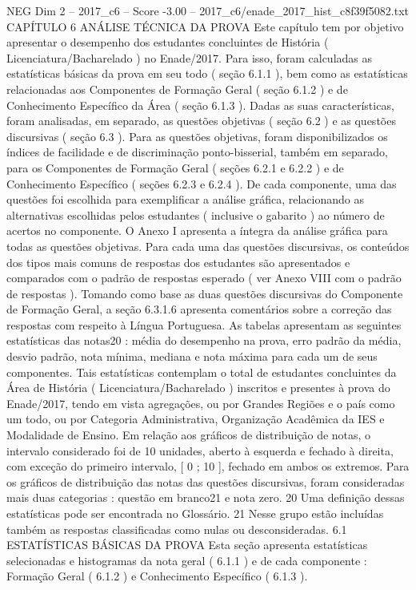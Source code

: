 \begin{textsample}{NEG Dim 2 – 2017\_c6 – Score -3.00 – 2017\_c6/enade\_2017\_hist\_c8f39f5082.txt}  \label{ex:f2_neg_161}
CAPÍTULO 6 ANÁLISE TÉCNICA DA PROVA Este capítulo tem por objetivo apresentar o desempenho dos estudantes concluintes de História ( Licenciatura/Bacharelado ) no Enade/2017.
Para isso, foram calculadas as estatísticas básicas da prova em seu todo ( seção 6.1.1 ), bem como as estatísticas relacionadas aos Componentes de Formação Geral ( seção 6.1.2 ) e de Conhecimento Específico da Área ( seção 6.1.3 ).
Dadas as suas características, foram analisadas, em separado, as questões objetivas ( seção 6.2 ) e as questões discursivas ( seção 6.3 ).
Para as questões objetivas, foram disponibilizados os índices de facilidade e de discriminação ponto-bisserial, também em separado, para os Componentes de Formação Geral ( seções 6.2.1 e 6.2.2 ) e de Conhecimento Específico ( seções 6.2.3 e 6.2.4 ).
De cada componente, uma das questões foi escolhida para exemplificar a análise gráfica, relacionando as alternativas escolhidas pelos estudantes ( inclusive o gabarito ) ao número de acertos no componente.
O Anexo I apresenta a íntegra da análise gráfica para todas as questões objetivas.
Para cada uma das questões discursivas, os conteúdos dos tipos mais comuns de respostas dos estudantes são apresentados e comparados com o padrão de respostas esperado ( ver Anexo VIII com o padrão de respostas ).
Tomando como base as duas questões discursivas do Componente de Formação Geral, a seção 6.3.1.6 apresenta comentários sobre a correção das respostas com respeito à Língua Portuguesa.
As tabelas apresentam as seguintes estatísticas das notas20 : média do desempenho na prova, erro padrão da média, desvio padrão, nota mínima, mediana e nota máxima para cada um de seus componentes.
Tais estatísticas contemplam o total de estudantes concluintes da Área de História ( Licenciatura/Bacharelado ) inscritos e presentes à prova do Enade/2017, tendo em vista agregações, ou por Grandes Regiões e o país como um todo, ou por Categoria Administrativa, Organização Acadêmica da IES e Modalidade de Ensino.
Em relação aos gráficos de distribuição de notas, o intervalo considerado foi de 10 unidades, aberto à esquerda e fechado à direita, com exceção do primeiro intervalo, [ 0 ; 10 ], fechado em ambos os extremos.
Para os gráficos de distribuição das notas das questões discursivas, foram consideradas mais duas categorias : questão em branco21 e nota zero. 20 Uma definição dessas estatísticas pode ser encontrada no Glossário. 21 Nesse grupo estão incluídas também as respostas classificadas como nulas ou desconsideradas. 6.1 ESTATÍSTICAS BÁSICAS DA PROVA Esta seção apresenta estatísticas selecionadas e histogramas da nota geral ( 6.1.1 ) e de cada componente : Formação Geral ( 6.1.2 ) e Conhecimento Específico ( 6.1.3 ).

\end{textsample}
